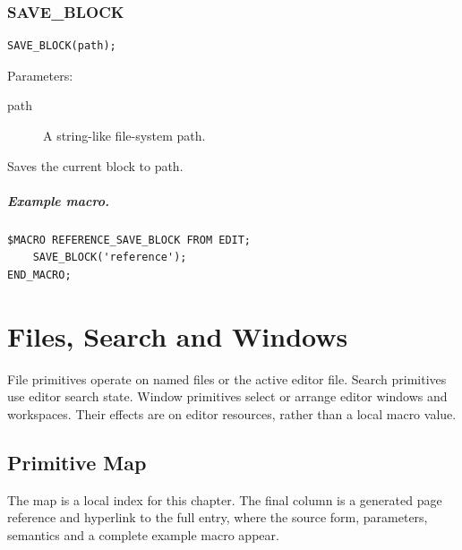 \documentclass[a4paper,10pt,twoside,openany]{book}
\newenvironment{mrmacextension}{\begin{changebar}}{\end{changebar}}
\begin{document}
\begin{mrmacextension}
\label{prim:procedure-save-block}
\subsection*{SAVE\_BLOCK}
\begin{verbatim}
SAVE_BLOCK(path);
\end{verbatim}
Parameters:
\begin{description}
\item[path] A string-like file-system path.
\end{description}

Saves the current block to path.

\paragraph{Example macro.}
\begin{verbatim}
$MACRO REFERENCE_SAVE_BLOCK FROM EDIT;
    SAVE_BLOCK('reference');
END_MACRO;
\end{verbatim}
\end{mrmacextension}


\chapter{Files, Search and Windows}

File primitives operate on named files or the active editor file. Search primitives use editor search state. Window primitives select or arrange editor windows and workspaces. Their effects are on editor resources, rather than a local macro value.

\section{Primitive Map}
The map is a local index for this chapter. The final column is a generated page
reference and hyperlink to the full entry, where the source form, parameters,
semantics and a complete example macro appear.
\end{document}
